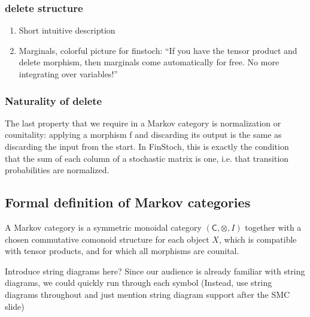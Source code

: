 \begin{frame}
    \frametitle{delete structure}
    \begin{enumerate}
        \item Short intuitive description
        \item Marginals, colorful picture for finstoch: “If you have the tensor product and delete morphism, then marginals come automatically for free. No more integrating over variables!”
    \end{enumerate}
\end{frame}

\begin{frame}
    \frametitle{Naturality of delete}
The last property that we require in a Markov category is normalization or counitality: applying a morphism f and discarding its output is the same as discarding the input from the start.  In FinStoch, this is exactly the condition that the sum of each column of a stochastic matrix is one, i.e. that transition probabilities are normalized.
\end{frame}

\subsection{Formal definition of Markov categories}

\begin{frame}
    \begin{definition}
        A Markov category is a symmetric monoidal category $(\mathsf{C}, \otimes, I)$ together with a chosen commutative comonoid structure for each object $X$, which is compatible with tensor products, and for which all morphisms are counital.
    \end{definition}
\end{frame}

\begin{frame} %
    Introduce string diagrams here? Since our audience is already familiar with string diagrams, we could quickly run through each symbol
    (Instead, use string diagrams throughout and just mention string diagram support after the SMC slide)
\end{frame}
